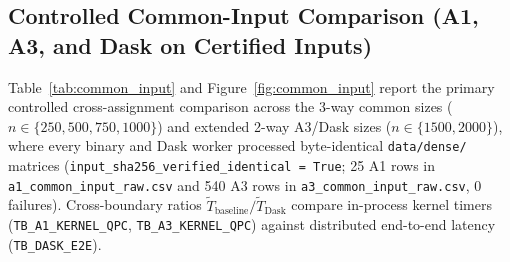 \documentclass[11pt,a4paper]{article}
\begin{document}
\subsection{Controlled Common-Input Comparison (A1, A3, and Dask on Certified Inputs)}
Table~\ref{tab:common_input} and Figure~\ref{fig:common_input} report the primary controlled cross-assignment comparison across the 3-way common sizes ($n \in \{250, 500, 750, 1000\}$) and extended 2-way A3/Dask sizes ($n \in \{1500, 2000\}$), where every binary and Dask worker processed byte-identical \nolinkurl{data/dense/} matrices (\texttt{input\_sha256\_verified\_identical = True}; 25 A1 rows in \nolinkurl{a1_common_input_raw.csv} and 540 A3 rows in \nolinkurl{a3_common_input_raw.csv}, 0 failures). Cross-boundary ratios $\tilde{T}_{\text{baseline}} / \tilde{T}_{\text{Dask}}$ compare in-process kernel timers (\texttt{TB\_A1\_KERNEL\_QPC}, \texttt{TB\_A3\_KERNEL\_QPC}) against distributed end-to-end latency (\texttt{TB\_DASK\_E2E}).
\end{document}

